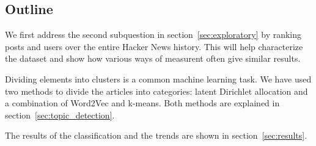 \subsection{Outline}
We first address the second subquestion in section~\ref{sec:exploratory}
 by ranking posts and users over the entire Hacker News history. This will help characterize the dataset and show how various ways of measurent often give similar results.

Dividing elements into clusters is a common machine learning task. We have used two methods to divide the articles into categories: latent Dirichlet allocation and a combination of Word2Vec and k-means. Both methods are explained in section~\ref{sec:topic_detection}. 

The results of the classification and the trends are shown in section~\ref{sec:results}.